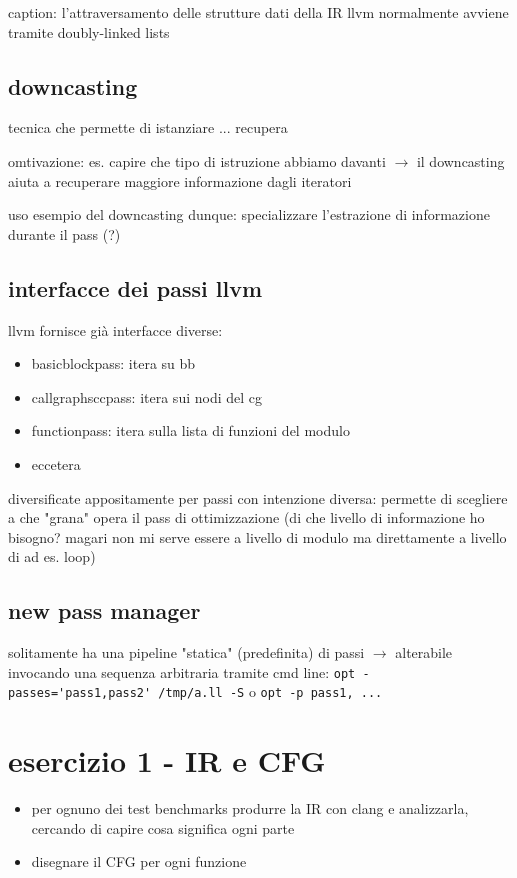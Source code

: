 caption: l'attraversamento delle strutture dati della IR llvm normalmente avviene tramite doubly-linked lists

\subsection{downcasting}

tecnica che permette di istanziare ... recupera

omtivazione: es. capire che tipo di istruzione abbiamo davanti $\rightarrow$ il downcasting aiuta a recuperare maggiore informazione dagli iteratori

uso esempio del downcasting dunque: specializzare l'estrazione di informazione durante il pass (?)

\subsection{interfacce dei passi llvm}

llvm fornisce gi\`a interfacce diverse:
\begin{itemize}
  \item basicblockpass: itera su bb
  \item callgraphsccpass: itera sui nodi del cg
  \item functionpass: itera sulla lista di funzioni del modulo
  \item eccetera
\end{itemize}

diversificate appositamente per passi con intenzione diversa: permette di scegliere a che "grana" opera il pass di ottimizzazione (di che livello di informazione ho bisogno? magari non mi serve essere a livello di modulo ma direttamente a livello di ad es. loop)


\subsection{new pass manager}

solitamente ha una pipeline "statica" (predefinita) di passi $\rightarrow$ alterabile invocando una sequenza arbitraria tramite cmd line: \lstinline|opt -passes='pass1,pass2' /tmp/a.ll -S| o \lstinline|opt -p pass1, ...|

\section{esercizio 1 - IR e CFG}

\begin{itemize}
  \item per ognuno dei test benchmarks produrre la IR con clang e analizzarla, cercando di capire cosa significa ogni parte
  \item disegnare il CFG per ogni funzione
\end{itemize}

